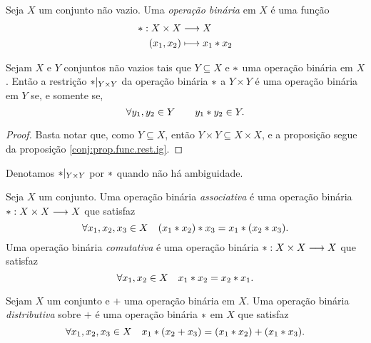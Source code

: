 \begin{defi}
	Seja $X$ um conjunto não vazio. Uma \emph{operação binária} em $X$ é uma função
	\begin{align*}
	\ast: X \times X &\longrightarrow X \\
			(x_1,x_2) &\longmapsto x_1 \ast x_2
	\end{align*}
\end{defi}

\begin{prop}
\label{prop:restri.op.bin}
	Sejam $X$ e $Y$ conjuntos não vazios tais que $Y \subseteq X$ e $ \ast $ uma operação binária em $X$. Então a restrição $ \ast |_{Y \times Y}$ da operação binária $ \ast $ a $Y \times Y$ é uma operação binária em $Y$ se, e somente se,
	\begin{equation*}
	\forall y_1,y_2 \in Y \qquad y_1 \ast y_2 \in Y.
	\end{equation*}
\end{prop}
\begin{proof}
	Basta notar que, como $Y \subseteq X$, então $Y \times Y \subseteq X \times X$, e a proposição segue da proposição \ref{conj:prop.func.rest.ig}.
\end{proof}

Denotamos $ \ast |_{Y \times Y}$ por $ \ast $ quando não há ambiguidade.

\begin{defi}
	Seja $X$ um conjunto. Uma operação binária \emph{associativa} é uma operação binária $ \ast : X \times X \longrightarrow X$ que satisfaz
	\begin{equation*}
	\forall x_1,x_2,x_3 \in X \quad (x_1 \ast x_2) \ast x_3 = x_1 \ast (x_2 \ast x_3).
	\end{equation*}
	Uma operação binária \emph{comutativa} é uma operação binária $ \ast : X \times X \longrightarrow X$ que satisfaz
	\begin{equation*}
	\forall x_1,x_2 \in X \quad x_1 \ast x_2 = x_2 \ast x_1.
	\end{equation*}
\end{defi}

\begin{defi}
	Sejam $X$ um conjunto e $+$ uma operação binária em $X$. Uma operação binária \emph{distributiva} sobre $+$ é uma operação binária $ \ast $ em $X$ que satisfaz
	\begin{equation*}
	\forall x_1,x_2,x_3 \in X \quad x_1 \ast (x_2 + x_3) = (x_1 \ast x_2) + (x_1 \ast x_3).
	\end{equation*}
\end{defi}

